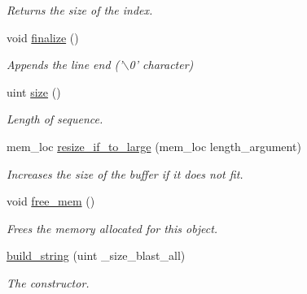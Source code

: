\begin{DoxyCompactItemize}
\begin{DoxyCompactList}\small\item\em Returns the size of the index. \end{DoxyCompactList}\item 
\hypertarget{classbuild__string_a9e12cd7000135806bd6073e5aa867dbd}{
void \hyperlink{classbuild__string_a9e12cd7000135806bd6073e5aa867dbd}{finalize} ()}
\label{classbuild__string_a9e12cd7000135806bd6073e5aa867dbd}

\begin{DoxyCompactList}\small\item\em Appends the line end ('$\backslash$0' character) \end{DoxyCompactList}\item 
\hypertarget{classbuild__string_a2f3695b7e6a0075abe4417f193b3eaf2}{
uint \hyperlink{classbuild__string_a2f3695b7e6a0075abe4417f193b3eaf2}{size} ()}
\label{classbuild__string_a2f3695b7e6a0075abe4417f193b3eaf2}

\begin{DoxyCompactList}\small\item\em Length of sequence. \end{DoxyCompactList}\item 
mem\_\-loc \hyperlink{classbuild__string_abf31cdd8cf4dc39a75f22362f66ca139}{resize\_\-if\_\-to\_\-large} (mem\_\-loc length\_\-argument)
\begin{DoxyCompactList}\small\item\em Increases the size of the buffer if it does not fit. \end{DoxyCompactList}\item 
\hypertarget{classbuild__string_a13a4d89be52ace631744c302e2730a0f}{
void \hyperlink{classbuild__string_a13a4d89be52ace631744c302e2730a0f}{free\_\-mem} ()}
\label{classbuild__string_a13a4d89be52ace631744c302e2730a0f}

\begin{DoxyCompactList}\small\item\em Frees the memory allocated for this object. \end{DoxyCompactList}\item 
\hypertarget{classbuild__string_a052f287f040fd2869e979fa362018d18}{
\hyperlink{classbuild__string_a052f287f040fd2869e979fa362018d18}{build\_\-string} (uint \_\-size\_\-blast\_\-all)}
\label{classbuild__string_a052f287f040fd2869e979fa362018d18}

\begin{DoxyCompactList}\small\item\em The constructor. \end{DoxyCompactList}\end{DoxyCompactItemize}
